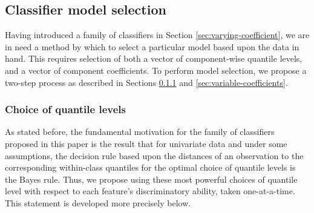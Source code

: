 



\subsection{Classifier model selection}
\label{sec:model-selection}

Having introduced a family of classifiers in Section
\ref{sec:varying-coefficient}, we are in need a method by which to select a
particular model based upon the data in hand.  This requires selection of both a
vector of component-wise quantile levels, and a vector of component
coefficients.  To perform model selection, we propose a two-step process as
described in Sections \ref{sec:choice-of-quantile-lev} and
\ref{sec:variable-coefficients}.




\subsubsection{Choice of quantile levels}
\label{sec:choice-of-quantile-lev}

As stated before, the fundamental motivation for the family of classifiers
proposed in this paper is the result that for univariate data and under some
assumptions, the decision rule based upon the distances of an observation to the
corresponding within-class quantiles for the optimal choice of quantile levels
is the Bayes rule.  Thus, we propose using these most powerful choices of
quantile level with respect to each feature's discriminatory ability, taken
one-at-a-time.  This statement is developed more precisely below.

